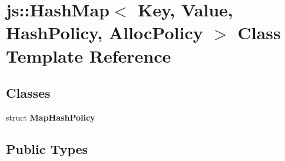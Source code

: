 \hypertarget{classjs_1_1_hash_map}{\section{js\-:\-:Hash\-Map$<$ Key, Value, Hash\-Policy, Alloc\-Policy $>$ Class Template Reference}
\label{classjs_1_1_hash_map}
}
\subsection*{Classes}
\begin{DoxyCompactItemize}
\item 
struct {\bfseries Map\-Hash\-Policy}
\end{DoxyCompactItemize}
\subsection*{Public Types}
